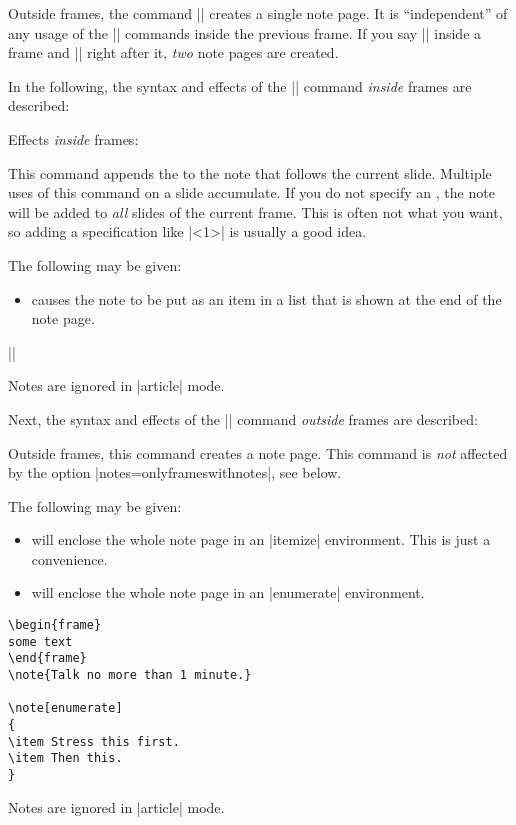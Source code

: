 Outside frames, the command |\note| creates a single note page. It is ``independent'' of any usage of the |\note| commands inside the previous frame. If you say |\note| inside a frame and |\note| right after it, \emph{two} note pages are created.

In the following, the syntax and effects of the |\note| command \emph{inside} frames are described:

\begin{command}{\note{}}
  Effects \emph{inside} frames:

  This command appends the  to the note that follows the current slide. Multiple uses of this command on a slide accumulate. If you do not specify an , the note will be added to \emph{all} slides of the current frame. This is often not what you want, so adding a specification like |<1>| is usually a good idea.

  The following  may be given:
  \begin{itemize}
  \item
     causes the note to be put as an item in a list that is shown at the end of the note page.
  \end{itemize}

  \example||

  \articlenote
  Notes are ignored in |article| mode.

\end{command}

Next, the syntax and effects of the |\note| command \emph{outside} frames are described:

\begin{command}{\note{}}
  Outside frames, this command creates a note page. This command is \emph{not} affected by the option |notes=onlyframeswithnotes|, see below.

  The following  may be given:
  \begin{itemize}
  \item
     will enclose the whole note page in an |itemize| environment. This is just a convenience.
  \item
     will enclose the whole note page in an |enumerate| environment.
  \end{itemize}

  \example
\begin{verbatim}
\begin{frame}
some text
\end{frame}
\note{Talk no more than 1 minute.}

\note[enumerate]
{
\item Stress this first.
\item Then this.
}
\end{verbatim}

  \articlenote
  Notes are ignored in |article| mode.
\end{command}

